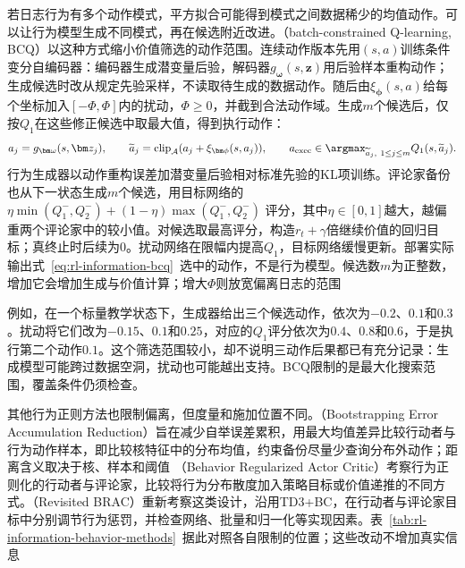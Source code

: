若日志行为有多个动作模式，平方拟合可能得到模式之间数据稀少的均值动作。可以让行为模型生成不同模式，再在候选附近改进。（batch-constrained Q-learning, BCQ）以这种方式缩小价值筛选的动作范围。连续动作版本先用$(s,a)$训练条件变分自编码器：编码器生成潜变量后验，解码器$g_{\bm\omega}(s,\bm z)$用后验样本重构动作；生成候选时改从规定先验采样，不读取待生成的数据动作。随后由$\xi_{\bm\phi}(s,a)$给每个坐标加入$[-\Phi,\Phi]$内的扰动，$\Phi\geq0$，并截到合法动作域。生成$m$个候选后，仅按$Q_1$在这些修正候选中取最大值，得到执行动作：
\begin{equation}
  \label{eq:rl-information-bcq}
  a_j=g_{\bm\omega}(s,\bm z_j),\qquad
  \widetilde a_j=\operatorname{clip}_{\mathcal A}
                  (a_j+\xi_{\bm\phi}(s,a_j)),\qquad
  a_{\mathrm{exec}}\in\argmax_{\widetilde a_j,\ 1\leq j\leq m}
                  Q_1(s,\widetilde a_j).
\end{equation}
行为生成器以动作重构误差加潜变量后验相对标准先验的KL项训练。评论家备份也从下一状态生成$m$个候选，用目标网络的
$\eta\min(Q_1^-,Q_2^-)+(1-\eta)\max(Q_1^-,Q_2^-)$
评分，其中$\eta\in[0,1]$越大，越偏重两个评论家中的较小值。对候选取最高评分，构造$r_t+\gamma$倍继续价值的回归目标；真终止时后续为0。扰动网络在限幅内提高$Q_1$，目标网络缓慢更新。部署实际输出式~\eqref{eq:rl-information-bcq}~选中的动作，不是行为模型。候选数$m$为正整数，增加它会增加生成与价值计算；增大$\Phi$则放宽偏离日志的范围

例如，在一个标量教学状态下，生成器给出三个候选动作，依次为$-0.2$、$0.1$和$0.3$。扰动将它们改为$-0.15$、$0.1$和$0.25$，对应的$Q_1$评分依次为$0.4$、$0.8$和$0.6$，于是执行第二个动作$0.1$。这个筛选范围较小，却不说明三动作后果都已有充分记录：生成模型可能跨过数据空洞，扰动也可能越出支持。BCQ限制的是最大化搜索范围，覆盖条件仍须检查。

其他行为正则方法也限制偏离，但度量和施加位置不同。（Bootstrapping Error Accumulation Reduction）旨在减少自举误差累积，用最大均值差异比较行动者与行为动作样本，即比较核特征中的分布均值，约束备份尽量少查询分布外动作；距离含义取决于核、样本和阈值
（Behavior Regularized Actor Critic）考察行为正则化的行动者与评论家，比较将行为分布散度加入策略目标或价值递推的不同方式。（Revisited BRAC）重新考察这类设计，沿用TD3+BC，在行动者与评论家目标中分别调节行为惩罚，并检查网络、批量和归一化等实现因素。表~\ref{tab:rl-information-behavior-methods}~据此对照各自限制的位置；这些改动不增加真实信息

